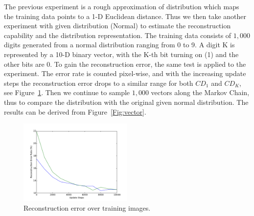 \documentclass[11pt,twoside,a4paper]{article}
\begin{document}

The previous experiment is a rough approximation of distribution which maps the training data points to a 1-D Euclidean distance.
Thus we then take another experiment with given distribution (Normal) to estimate the reconstruction capability and the distribution representation.
The training data consists of $1,000$ digits generated from a normal distribution ranging from 0 to 9.
A digit K is represented by a 10-D binary vector, with the K-th bit turning on (1) and the other bits are 0.
To gain the reconstruction error, the same test is applied to the experiment.
The error rate is counted pixel-wise, and with the increasing update steps the reconstruction error drops to a similar range for both $CD_1$ and $CD_K$, see Figure~\ref{Fig:disRecon}.
Then we continue to sample $1,000$ vectors along the Markov Chain, thus to compare the distribution with the original given normal distribution.
The results can be derived from Figure~\ref{Fig:vector}.
\begin{figure}[hbt]
				\centering
				\includegraphics[width=0.5\textwidth]{img/ReconError.pdf}
				\caption{Reconstruction error over training images. } 
				\label{Fig:disRecon}
\end{figure}
\end{document}
